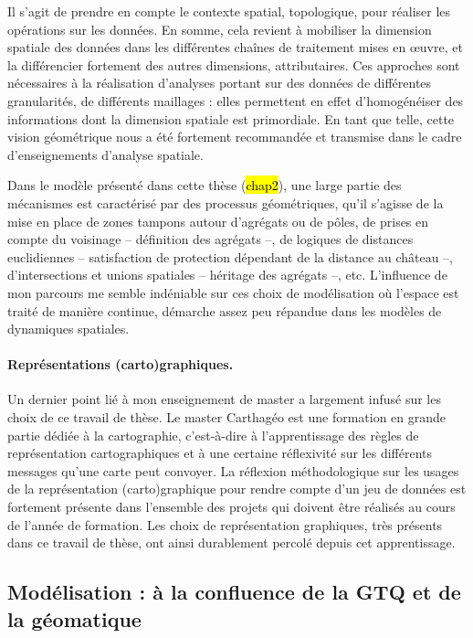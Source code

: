 Il s'agit de prendre en compte le contexte spatial, topologique, pour réaliser les opérations sur les données.
En somme, cela revient à mobiliser la dimension spatiale des données dans les différentes chaînes de traitement mises en œuvre, et la différencier fortement des autres dimensions, attributaires.
Ces approches sont nécessaires à la réalisation d'analyses portant sur des données de différentes granularités, de différents maillages : elles permettent en effet d'homogénéiser des informations dont la dimension spatiale est primordiale.
En tant que telle, cette vision \og géométrique\fg{} nous a été fortement recommandée et transmise dans le cadre d'enseignements d'analyse spatiale.

Dans le modèle présenté dans cette thèse (\hl{chap2}), une large partie des mécanismes est caractérisé par des processus géométriques, qu'il s'agisse de la mise en place de zones tampons autour d'agrégats ou de pôles, de prises en compte du voisinage -- définition des agrégats --, de logiques de distances euclidiennes -- satisfaction de protection dépendant de la distance au château --, d'intersections et unions spatiales -- héritage des agrégats --, etc.
L'influence de mon parcours me semble indéniable sur ces choix de modélisation où l'espace est traité de manière continue, démarche assez peu répandue dans les modèles de dynamiques spatiales.

\paragraph{Représentations (carto)graphiques.}

Un dernier point lié à mon enseignement de master a largement infusé sur les choix de ce travail de thèse.
Le master Carthagéo est une formation en grande partie dédiée à la cartographie, c'est-à-dire à l'apprentissage des \og règles\fg{} de représentation cartographiques et à une certaine réflexivité sur les différents messages qu'une carte peut convoyer.
La réflexion méthodologique sur les usages de la représentation (carto)graphique pour rendre compte d'un jeu de données est fortement présente dans l'ensemble des projets qui doivent être réalisés au cours de l'année de formation.
Les choix de représentation graphiques, très présents dans ce travail de thèse, ont ainsi durablement percolé depuis cet apprentissage.

\subsection{Modélisation : à la confluence de la GTQ et de la géomatique}

